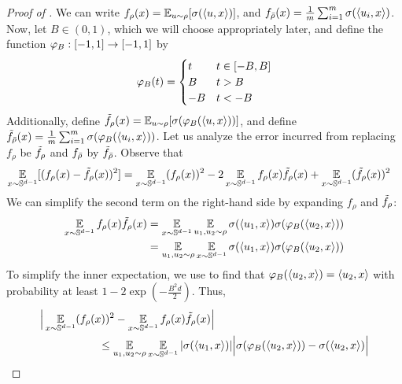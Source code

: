 \begin{proof} [Proof of ]
We can write $f_\rho(x) = \operatorname*{\mathbb{E}}_{u \sim \rho} [\sigma(\langle u, x \rangle)]$, and $f_{{\bar{\rho}}}(x) = \frac{1}{m} \sum_{i = 1}^m \sigma(\langle u_i, x \rangle)$. Now, let $B \in (0, 1)$, which we will choose appropriately later, and define the function ${\varphi_B} : [-1, 1] \to [-1, 1]$ by
\begin{align}
{\varphi_B}(t)
= \begin{cases}
t & t \in [-B, B] \\
B & t > B \\
-B & t < -B
\end{cases}
\end{align}
Additionally, define $\tilde{f}_\rho(x) = \operatorname*{\mathbb{E}}_{u \sim \rho} [\sigma({\varphi_B}(\langle u, x \rangle))]$, and define $\tilde{f}_{{\bar{\rho}}}(x) = \frac{1}{m} \sum_{i = 1}^m \sigma({\varphi_B}(\langle u_i, x \rangle))$. Let us analyze the error incurred from replacing $f_\rho$ be $\tilde{f}_\rho$ and $f_{{\bar{\rho}}}$ by $\tilde{f}_{{\bar{\rho}}}$. Observe that
\begin{align}
\operatorname*{\mathbb{E}}_{x \sim \mathbb{S}^{d - 1}} [(f_\rho(x)  -\tilde{f}_\rho(x))^2]
& = \operatorname*{\mathbb{E}}_{x \sim \mathbb{S}^{d - 1}} (f_\rho(x))^2 - 2 \operatorname*{\mathbb{E}}_{x \sim \mathbb{S}^{d - 1}} f_\rho(x) \tilde{f}_\rho(x) + \operatorname*{\mathbb{E}}_{x \sim \mathbb{S}^{d - 1}} (\tilde{f}_\rho(x))^2
\end{align}
We can simplify the second term on the right-hand side by expanding $f_\rho$ and $\tilde{f}_\rho$:
\begin{align}
\operatorname*{\mathbb{E}}_{x \sim \mathbb{S}^{d - 1}} f_\rho(x) \tilde{f}_\rho(x)
& = \operatorname*{\mathbb{E}}_{x \sim \mathbb{S}^{d - 1}} \operatorname*{\mathbb{E}}_{u_1, u_2 \sim \rho} \sigma(\langle u_1, x \rangle) \sigma({\varphi_B}(\langle u_2, x \rangle)) \\
& = \operatorname*{\mathbb{E}}_{u_1, u_2 \sim \rho} \operatorname*{\mathbb{E}}_{x \sim \mathbb{S}^{d - 1}} \sigma(\langle u_1, x \rangle) \sigma({\varphi_B}(\langle u_2, x \rangle)) \label{eq:tilde_expansion}
\end{align}
To simplify the inner expectation, we use  to find that ${\varphi_B}(\langle u_2, x \rangle) = \langle u_2, x \rangle$ with probability at least $1 - 2 \exp(-\frac{B^2 d}{2})$. Thus,
\begin{align}
& \Big|\E_{x \sim \bbS^{d - 1}} (f_\rho(x))^2 - \E_{x \sim \bbS^{d - 1}} f_\rho(x) \ftilde_\rho(x) \Big| \\
& \nextlinespace\nextlinespace \leq \E_{\u_1, \u_2 \sim \rho} \E_{x \sim \bbS^{d - 1}} |\sigma(\langle \u_1, x \rangle)| \Big|\sigma(\truncB(\langle \u_2, x \rangle)) - \sigma(\langle \u_2, x \rangle) \Big| \\

\end{align}
\end{proof}
